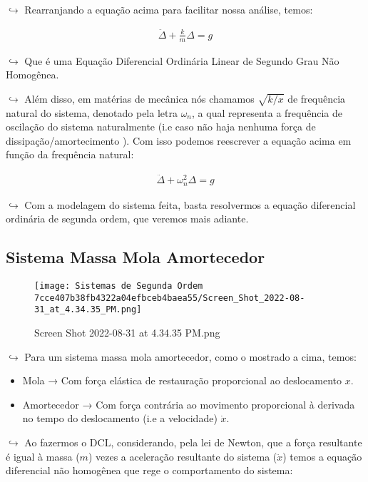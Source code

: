 \documentclass[]{article}
\providecommand{\tightlist}{%
  \setlength{\itemsep}{0pt}\setlength{\parskip}{0pt}}
\begin{document}
  \(\hookrightarrow\) Rearranjando a equação acima para facilitar nossa
  análise, temos:

  \[
  \begin{align}
  \ddot\Delta + \frac{k}{m}\Delta = g
  \end{align}
  \]

  \(\hookrightarrow\) Que é uma Equação Diferencial Ordinária Linear de
  Segundo Grau Não Homogênea.

  \(\hookrightarrow\) Além disso, em matérias de mecânica nós chamamos
  \(\sqrt{k/x}\) de frequência natural do sistema, denotado pela letra
  \(\omega_n\), a qual representa a frequência de oscilação do sistema
  naturalmente (i.e caso não haja nenhuma força de
  dissipação/amortecimento ). Com isso podemos reescrever a equação acima
  em função da frequência natural:

  \[
  \begin{align}
  \ddot \Delta  + \omega_n^2 \Delta = g
  \end{align}
  \]

  \(\hookrightarrow\) Com a modelagem do sistema feita, basta resolvermos
  a equação diferencial ordinária de segunda ordem, que veremos mais
  adiante.

  \hypertarget{sistema-massa-mola-amortecedor}{%
  \subsection{Sistema Massa Mola
  Amortecedor}\label{sistema-massa-mola-amortecedor}}

  \begin{figure}
  \centering
  \texttt{[image: Sistemas de Segunda Ordem 7cce407b38fb4322a04efbceb4baea55/Screen\_Shot\_2022-08-31\_at\_4.34.35\_PM.png]}
  \caption{Screen Shot 2022-08-31 at 4.34.35 PM.png}
  \end{figure}

  \(\hookrightarrow\) Para um sistema massa mola amortecedor, como o
  mostrado a cima, temos:

  \begin{itemize}
  \tightlist
  \item
    Mola → Com força elástica de restauração proporcional ao deslocamento
    \(x\).
  \item
    Amortecedor → Com força contrária ao movimento proporcional à derivada
    no tempo do deslocamento (i.e a velocidade) \(\dot x\).
  \end{itemize}

  \(\hookrightarrow\) Ao fazermos o DCL, considerando, pela lei de Newton,
  que a força resultante é igual à massa (\(m\)) vezes a aceleração
  resultante do sistema (\(\ddot x\)) temos a equação diferencial não
  homogênea que rege o comportamento do sistema:
\end{document}
